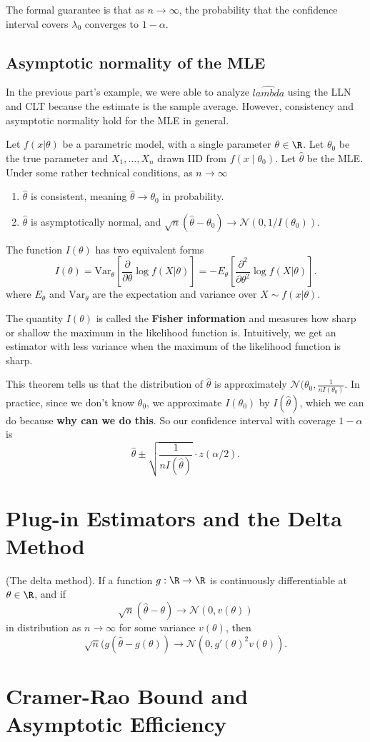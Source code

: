 The formal guarantee is that as $n\to\infty$, the probability that the confidence interval covers $\lambda_0$ converges to $1-\alpha$. 
\subsection{Asymptotic normality of the MLE}
In the previous part's example, we were able to analyze $\hat{lambda}$ using the LLN and CLT because the estimate is the sample average. However, consistency and asymptotic normality hold for the MLE in general. 
\begin{thm}
    Let $f(x|\theta)$ be a parametric model, with a single parameter $\theta\in\R$. Let $\theta_0$ be the true parameter and $X_1, \dots, X_n$ drawn IID from $f(x\mid\theta_0)$. Let $\hat{\theta}$ be the MLE. Under some rather technical conditions, as $n\to\infty$
    \begin{enumerate}
        \item $\hat{\theta}$ is consistent, meaning $\hat{\theta}\to\theta_0$ in probability. 
        \item $\hat{\theta}$ is asymptotically normal, and $\sqrt{n}(\hat{\theta}-\theta_0) \to\mathcal{N}(0, 1/I(\theta_0))$. 
    \end{enumerate}
    The function $I(\theta)$ has two equivalent forms 
    \[I(\theta) = \mathrm{Var}_\theta\left[\frac{\partial}{\partial\theta}\log f(X|\theta)\right] = -E_\theta\left[\frac{\partial^2}{\partial \theta^2}\log f(X|\theta)\right]. \]
    where $E_\theta$ and $\mathrm{Var}_\theta$ are the expectation and variance over $X\sim f(x|\theta)$.  
\end{thm}
The quantity $I(\theta)$ is called the {\bf Fisher information} and measures how sharp or shallow the maximum in the likelihood function is. Intuitively, we get an estimator with less variance when the maximum of the likelihood function is sharp. 

This theorem tells us that the distribution of $\hat{\theta}$ is approximately $\mathcal{N}(\theta_0, \frac{1}{nI(\theta_0)}$. In practice, since we don't know $\theta_0$, we approximate $I(\theta_0)$ by $I(\hat{\theta})$, which we can do because {\bf why can we do this}. So our confidence interval with coverage $1-\alpha$ is 
\[\hat{\theta} \pm \sqrt{\frac{1}{nI(\hat{\theta})}}\cdot z(\alpha/2). \]
\section{Plug-in Estimators and the Delta Method}
\begin{thm}{(The delta method).}
    If a function $g:\R\to\R$ is continuously differentiable at $\theta\in\R$, and if 
    \[\sqrt{n}(\hat{\theta}-\theta)\to\mathcal{N}(0, v(\theta))\]
    in distribution as $n\to\infty$ for some variance $v(\theta)$, then 
    \[\sqrt{n}(g(\hat{\theta}-g(\theta))\to\mathcal{N}(0, g'(\theta)^2v(\theta)). \]
\end{thm}
\section{Cramer-Rao Bound and Asymptotic Efficiency}
